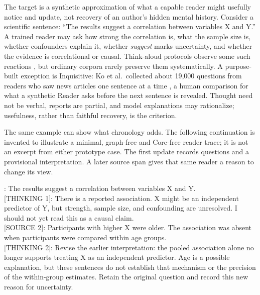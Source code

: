 \documentclass[11pt]{article}
\begin{document}
The target is a synthetic approximation of what a capable reader might
usefully notice and update, not recovery of an author's hidden mental history.
Consider a scientific sentence: \enquote{The results suggest a correlation between
variables X and Y.} A trained reader may ask how strong the correlation
is, what the sample size is, whether confounders explain it, whether
\emph{suggest} marks uncertainty, and whether the evidence is correlational or
causal. Think-aloud protocols observe some such reactions
\cite{ericsson1984protocol}, but ordinary corpora rarely preserve them
systematically. A purpose-built exception is Inquisitive: Ko et al.\ collected
about 19,000 questions from readers who saw news articles one sentence at a
time \cite{ko2020inquisitive}, a human comparison for what a synthetic Reader
asks before the next sentence is revealed. Thought need not be verbal, reports are partial, and model
explanations may rationalize; usefulness, rather than faithful recovery, is the
criterion.

The same example can show what chronology adds. The following continuation is
invented to illustrate a minimal, graph-free and Core-free reader trace; it is
not an excerpt from either prototype case. The first update records questions
and a provisional interpretation. A later source span gives that same reader a
reason to change its view.

\begin{compactmetabox}
[SOURCE 1]: The results suggest a correlation between variables X and Y.\\[0.35em]
[THINKING 1]: There is a reported association. X might be an independent predictor of Y, but strength, sample size, and confounding are unresolved. I should not yet read this as a causal claim.\\[0.55em]
[SOURCE 2]: Participants with higher X were older. The association was absent when participants were compared within age groups.\\[0.35em]
[THINKING 2]: Revise the earlier interpretation: the pooled association alone no longer supports treating X as an independent predictor. Age is a possible explanation, but these sentences do not establish that mechanism or the precision of the within-group estimates. Retain the original question and record this new reason for uncertainty.
\end{compactmetabox}
\end{document}
